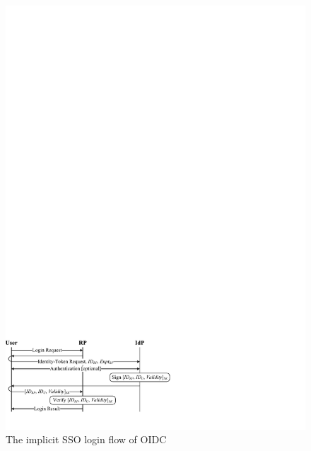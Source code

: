 \begin{figure}[t]
  \centering
  \includegraphics[width=0.99\linewidth]{fig/OIDC.pdf}
  \caption{The implicit SSO login flow of OIDC}
  \label{fig:OpenID}
\end{figure}

